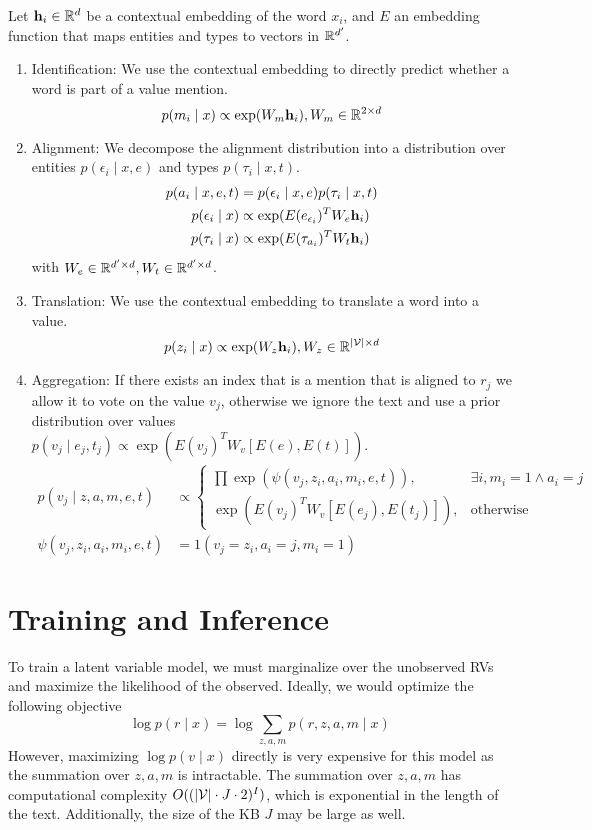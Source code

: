 \documentclass[12pt]{article}
\begin{document}
Let $\mathbf{h}_i \in \mathbb{R}^d$ be a contextual embedding of the word $x_i$,
and $E$ an embedding function that maps entities and types
to vectors in $\mathbb{R}^{d'}$.
\begin{enumerate}
\item Identification: We use the contextual embedding to directly predict
whether a word is part of a value mention.
$$p(m_i \mid x) \propto \exp(W_m\mathbf{h}_i), W_m \in \mathbb{R}^{2 \times d}$$
\item Alignment: We decompose the alignment distribution into a distribution over
entities $p(\epsilon_i \mid x,e)$ and types $p(\tau_i \mid x,t)$.
\begin{align*}
p(a_i \mid x,e,t) &= p(\epsilon_i \mid x,e)p(\tau_i \mid x,t)\\
p(\epsilon_i \mid x) &\propto \exp(E(e_{\epsilon_i})^T W_e \mathbf{h}_i)\\
p(\tau_i \mid x) &\propto \exp(E(\tau_{a_i})^T W_t \mathbf{h}_i)
\end{align*}
with $W_e \in \mathbb{R}^{d' \times d},W_t \in \mathbb{R}^{d' \times d}$.
\item Translation: We use the contextual embedding to translate a word
into a value.
$$p(z_i \mid x) \propto \exp(W_z \mathbf{h}_i), W_z \in \mathbb{R}^{|\mathcal{V}| \times d}$$
\item Aggregation:
If there exists an index that is a mention that is aligned to $r_j$
we allow it to vote on the value $v_j$, otherwise we ignore the text
and use a prior distribution over values $p(v_j \mid e_j, t_j) \propto \exp(E(v_j)^TW_v [E(e),E(t)])$.
\begin{align*}
p(v_j \mid z,a,m,e,t) &\propto \begin{cases}
    \prod \exp(\psi(v_j, z_i,a_i,m_i,e,t)),  & \exists i, m_i = 1 \wedge a_i = j\\
    \exp(E(v_j)^TW_v [E(e_j),E(t_j)]), & \textrm{otherwise}
\end{cases}\\
\psi(v_j, z_i, a_i, m_i,e,t) &= 1(v_j = z_i, a_i = j, m_i=1)%
\end{align*}
\end{enumerate}

\section{Training and Inference}
To train a latent variable model, we must marginalize over the unobserved RVs
and maximize the likelihood of the observed.
Ideally, we would optimize the following objective
\begin{equation}
\log p(r \mid x) = \log \sum_{z,a,m} p(r,z,a,m \mid x)
\end{equation}
However, maximizing $\log p(v \mid x)$ directly is very expensive for this model
as the summation over $z,a,m$ is intractable.
The summation over $z,a,m$ has computational complexity $O((|\mathcal{V}|\cdot J\cdot 2)^{I})$,
which is exponential in the length of the text.
Additionally, the size of the KB $J$ may be large as well.
\end{document}

